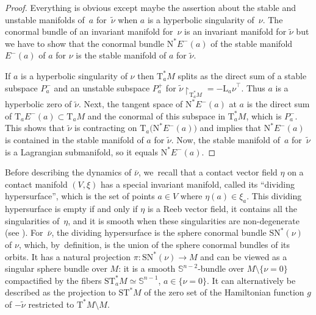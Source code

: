 \documentclass[10pt]{amsart}
\newcommand{\bS}{{\mathbb S}}
\newcommand{\sN}{\mathrm{N}^\ast}
\newcommand{\sSN}{\mathrm{SN}^\ast}
\newcommand{\sT}{\mathrm{T}^\ast}
\newcommand{\sST}{\mathrm{ST}^\ast}
\newcommand{\rT}{\mathrm{T}}
\newcommand{\hnu}{\tilde\nu}
\newcommand{\cnu}{\bar\nu}
\def\Lnu_#1{{\mathrm L_#1\nu}}
\newcommand{\rst}[1]{{\upharpoonright}_{\!#1}}
\let\on\colon
\theoremstyle{plain}
\theoremstyle{definition}
\begin{document}
\begin{proof}
Everything is obvious except maybe the assertion about the stable and unstable
manifolds of~$a$ for~$\hnu$ when $a$ is a hyperbolic singularity of~$\nu$. The
conormal bundle of an invariant manifold for~$\nu$ is an invariant manifold for
$\hnu$ but we have to show that the conormal bundle $\sN E^-(a)$ of the stable
manifold $E^-(a)$ of $a$ for $\nu$ is the stable manifold of $a$ for $\hnu$.

If $a$ is a hyperbolic singularity of $\nu$ then $\sT_aM$ splits as the direct
sum of a stable subspace $P_a^-$ and an unstable subspace $P_a^+$ for $\hnu \rst
{ \sT_aM } = -\Lnu_a^\top$. Thus $a$ is a hyperbolic zero of $\hnu$. Next, the
tangent space of $\sN E^-(a)$ at $a$ is the direct sum of $\rT_aE^-(a) \subset
\rT_aM$ and the conormal of this subspace in $\sT_aM$, which is $P_a^-$. This
shows that $\hnu$ is contracting on $\rT_a \bigl(\sN E^-(a)\bigr)$ and implies
that $\sN E^-(a)$ is contained in the stable manifold of $a$ for $\hnu$. Now,
the stable manifold of~$a$ for~$\hnu$ is a Lagrangian submanifold, so it equals
$\sN E^-(a)$.
\end{proof}

Before describing the dynamics of $\cnu$, we~recall that a contact vector field
$\eta$ on a contact manifold $(V,\xi)$ has a special invariant manifold, called
its ``dividing hypersurface'', which is the set of points $a \in V$ where $\eta
(a) \in \xi_a$. This dividing hypersurface is empty if and only if $\eta$ is a
Reeb vector field, it contains all the singularities of~$\eta$, and it is smooth
when these singularities are non-degenerate (see \cite{Gi}). For~$\cnu$, the
dividing hypersurface is the sphere conormal bundle $\sSN(\nu)$ of $\nu$, which, by~definition, is the union of the sphere conormal bundles of its orbits. It has
a natural projection $\pi \on \sSN(\nu) \to M$ and can be viewed as a singular
sphere bundle over $M$: it is a smooth $\bS^{n-2}$-bundle over $M \setminus \{\nu=0\}$
compactified by the fibers $\sST_aM \simeq \bS^{n-1}$, $a \in \{\nu=0\}$. It can
alternatively be described as the projection to $\sST M$ of the zero set of the
Hamiltonian function $g$ of $-\hnu$ restricted to $\sT M \setminus M$.
\end{document}
